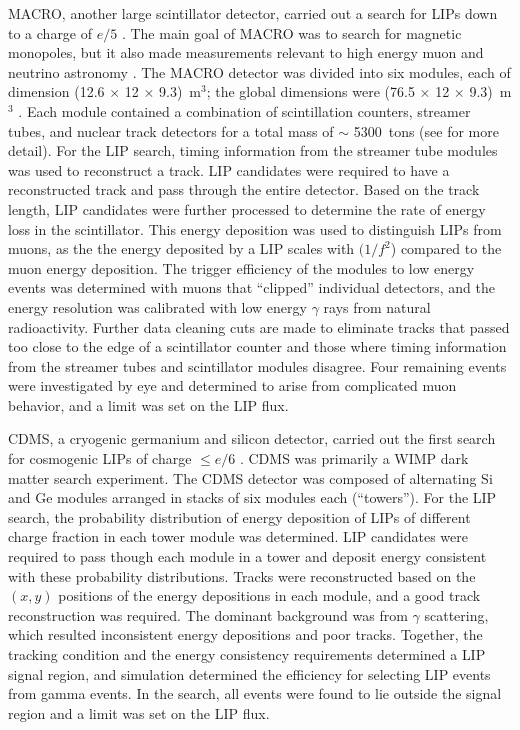 MACRO, another large scintillator detector, carried out a search for \ac{LIP}s down to a charge of $e/5$  \cite{Ambrosio2000} \cite{Ambrosio2004}. The main goal of MACRO was to search for magnetic monopoles, but it also made measurements relevant to high energy muon and neutrino astronomy \cite{Ambrosio2002}. The MACRO detector was divided into six modules, each of dimension (12.6 $\times$ 12 $\times$ 9.3)~m$^{3}$; the global dimensions were  (76.5 $\times$ 12 $\times$ 9.3)~m$^{3}$ \cite{Ambrosio2002}. Each module contained a combination of scintillation counters, streamer tubes, and nuclear track detectors for a total mass of $\sim$ 5300~tons (see \cite{Ambrosio2002} for more detail). For the \ac{LIP} search, timing information from the streamer tube modules was used to reconstruct a track. \ac{LIP} candidates were required to have a reconstructed track and pass through the entire detector. Based on the track length, \ac{LIP} candidates were further processed to determine the rate of energy loss in the scintillator. This energy deposition was used to distinguish \ac{LIP}s from muons, as the the energy deposited by a \ac{LIP} scales with $(1/f^{2}$) compared to the muon energy deposition. The trigger efficiency of the modules to low energy events was determined with muons that ``clipped'' individual detectors, and the energy resolution was calibrated with low energy $\gamma$ rays from natural radioactivity. Further data cleaning cuts are made to eliminate tracks that passed too close to the edge of a scintillator counter and those where timing information from the streamer tubes and scintillator modules disagree. Four remaining events were investigated by eye and determined to arise from complicated muon behavior, and a limit was set on the \ac{LIP} flux. 

\ac{CDMS}, a cryogenic germanium and silicon detector, carried out the first search for cosmogenic \ac{LIP}s of charge $\leqslant e/6$ \cite{Agnese2015}. \ac{CDMS} was primarily a \ac{WIMP} dark matter search experiment. The \ac{CDMS} detector was composed of alternating Si and Ge modules arranged in stacks of six modules each (``towers''). For the \ac{LIP} search, the probability distribution of energy deposition of \ac{LIP}s of different charge fraction in each tower module was determined. \ac{LIP} candidates were required to pass though each module in a tower and deposit energy consistent with these probability distributions. Tracks were reconstructed based on the $(x,y)$ positions of the energy depositions in each module, and a good track reconstruction was required. The dominant background was from $\gamma$ scattering, which resulted inconsistent energy depositions and poor tracks. Together, the tracking condition and the energy consistency requirements determined a \ac{LIP} signal region, and simulation determined the efficiency for selecting \ac{LIP} events from gamma events. In the search, all events were found to lie outside the signal region and a limit was set on the \ac{LIP} flux. 


